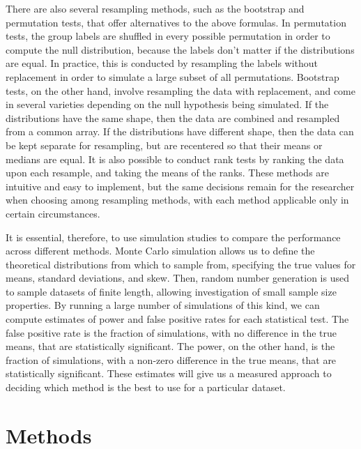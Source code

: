 \documentclass[10pt]{article} %
\begin{document}
There are also several resampling methods, such as the bootstrap and permutation tests, that offer alternatives to the above formulas. In permutation tests, the group labels are shuffled in every possible permutation in order to compute the null distribution, because the labels don't matter if the distributions are equal. In practice, this is conducted by resampling the labels without replacement in order to simulate a large subset of all permutations. Bootstrap tests, on the other hand, involve resampling the data with replacement, and come in several varieties depending on the null hypothesis being simulated. If the distributions have the same shape, then the data are combined and resampled from a common array. If the distributions have different shape, then the data can be kept separate for resampling, but are recentered so that their means or medians are equal. It is also possible to conduct rank tests by ranking the data upon each resample, and taking the means of the ranks. These methods are intuitive and easy to implement, but the same decisions remain for the researcher when choosing among resampling methods, with each method applicable only in certain circumstances. 

It is essential, therefore, to use simulation studies to compare the performance across different methods. Monte Carlo simulation allows us to define the theoretical distributions from which to sample from, specifying the true values for means, standard deviations, and skew. Then, random number generation is used to sample datasets of finite length, allowing investigation of small sample size properties. By running a large number of simulations of this kind, we can compute estimates of power and false positive rates for each statistical test. The false positive rate is the fraction of simulations, with no  difference in the true means, that are statistically significant. The power, on the other hand, is the fraction of simulations, with a non-zero difference in the true means, that are statistically significant. These estimates will give us a measured approach to deciding which method is the best to use for a particular dataset.

\section{Methods}
\end{document}

